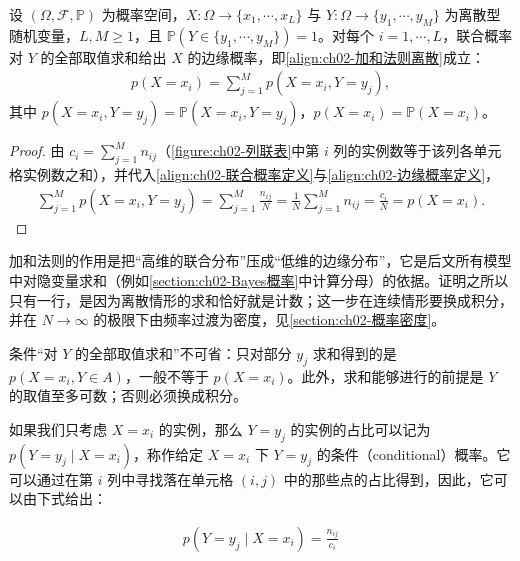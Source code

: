 \documentclass[../../main.tex]{subfiles}
\begin{document}
\begin{proposition}\label{proposition:ch02-加和法则离散}
设 $(\Omega,\mathcal{F},\mathbb{P})$ 为概率空间，$X:\Omega\to\{x_1,\cdots,x_L\}$ 与 $Y:\Omega\to\{y_1,\cdots,y_M\}$ 为离散型随机变量，$L,M\geqslant1$，且 $\mathbb{P}(Y\in\{y_1,\cdots,y_M\})=1$。对每个 $i=1,\cdots,L$，联合概率对 $Y$ 的全部取值求和给出 $X$ 的边缘概率，即\eqref{align:ch02-加和法则离散}成立：
\begin{align*}
  p(X=x_i)=\sum_{j=1}^{M}p(X=x_i,Y=y_j),
\end{align*}
其中 $p(X=x_i,Y=y_j)=\mathbb{P}(X=x_i,Y=y_j)$，$p(X=x_i)=\mathbb{P}(X=x_i)$。
\end{proposition}

\begin{proof}
由 $c_i=\sum_{j=1}^{M}n_{ij}$（\cref{figure:ch02-列联表}中第 $i$ 列的实例数等于该列各单元格实例数之和），并代入\eqref{align:ch02-联合概率定义}与\eqref{align:ch02-边缘概率定义}，
\begin{align*}
 \sum_{j=1}^{M} p(X=x_i,Y=y_j) = \sum_{j=1}^{M}\frac{n_{ij}}{N} = \frac{1}{N}\sum_{j=1}^{M}n_{ij} = \frac{c_i}{N} = p(X=x_i) .
\end{align*}
\end{proof}

\begin{remark}
加和法则的作用是把“高维的联合分布”压成“低维的边缘分布”，它是后文所有模型中对隐变量求和（例如\cref{section:ch02-Bayes概率}中计算分母）的依据。证明之所以只有一行，是因为离散情形的求和恰好就是计数；这一步在连续情形要换成积分，并在 $N\to\infty$ 的极限下由频率过渡为密度，见\cref{section:ch02-概率密度}。

条件“对 $Y$ 的全部取值求和”不可省：只对部分 $y_j$ 求和得到的是 $p(X=x_i,Y\in A)$，一般不等于 $p(X=x_i)$。此外，求和能够进行的前提是 $Y$ 的取值至多可数；否则必须换成积分。
\end{remark}

如果我们只考虑 $X=x_i$ 的实例，那么 $Y=y_j$ 的实例的占比可以记为 $p(Y=y_j\mid X=x_i)$，称作给定 $X=x_i$ 下 $Y=y_j$ 的条件（conditional）概率。它可以通过在第 $i$ 列中寻找落在单元格 $(i,j)$ 中的那些点的占比得到，因此，它可以由下式给出：

\begin{align}
  p(Y=y_j\mid X=x_i) = \frac{n_{ij}}{c_i}
  \label{align:ch02-条件概率定义}
\end{align}
\end{document}
